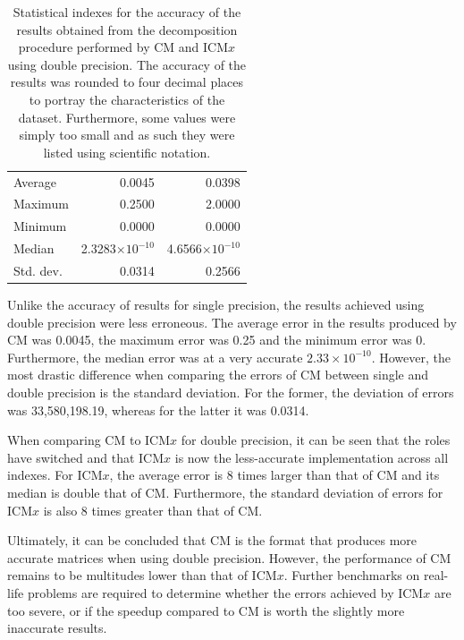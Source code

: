 \begin{table}[ht!]
	\centering
	\renewcommand{\arraystretch}{1.5}
	\begin{tabular}{|>{\footnotesize}l|>{\raggedleft\arraybackslash\footnotesize}r|>{\raggedleft\arraybackslash\footnotesize}r|}
		\hline
		\multicolumn{1}{|>{\centering\footnotesize}c|}{Accuracy index} & \multicolumn{1}{>{\centering\footnotesize}c|}{CM} & \multicolumn{1}{>{\centering\footnotesize}c|}{ICM$ x $} \\
		\hline
		Average   & 0.0045                   & 0.0398                   \\
		Maximum   & 0.2500                   & 2.0000                   \\
		Minimum   & 0.0000                   & 0.0000                   \\
		Median    & 2.3283$\times 10^{-10}$  & 4.6566$\times 10^{-10}$ \\
		Std. dev. & 0.0314                   & 0.2566                   \\
		\hline
	\end{tabular}
	\caption{Statistical indexes for the accuracy of the results obtained from the decomposition procedure performed by CM and ICM$ x $ using double precision. The accuracy of the results was rounded to four decimal places to portray the characteristics of the dataset. Furthermore, some values were simply too small and as such they were listed using scientific notation.}
	\label{Table:comparing-decomposition-implementations-performance-of-implementations-across-all-matrices-accuracy-statistical-indexes-double-precision}
\end{table}

Unlike the accuracy of results for single precision, the results achieved using double precision were less erroneous. The average error in the results produced by CM was 0.0045, the maximum error was 0.25 and the minimum error was 0. Furthermore, the median error was at a very accurate $2.33\times 10^{-10}$. However, the most drastic difference when comparing the errors of CM between single and double precision is the standard deviation. For the former, the deviation of errors was 33,580,198.19, whereas for the latter it was 0.0314.
\par When comparing CM to ICM$ x $ for double precision, it can be seen that the roles have switched and that ICM$ x $ is now the less-accurate implementation across all indexes. For ICM$ x $, the average error is 8 times larger than that of CM and its median is double that of CM. Furthermore, the standard deviation of errors for ICM$ x $ is also 8 times greater than that of CM.
\par Ultimately, it can be concluded that CM is the format that produces more accurate matrices when using double precision. However, the performance of CM remains to be multitudes lower than that of ICM$ x $. Further benchmarks on real-life problems are required to determine whether the errors achieved by ICM$ x $ are too severe, or if the speedup compared to CM is worth the slightly more inaccurate results.


